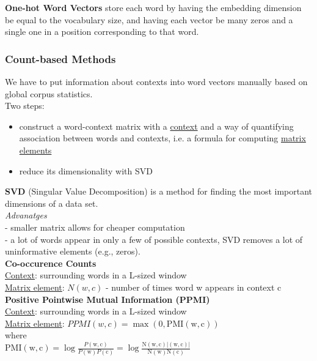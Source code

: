 \documentclass[8pt]{extarticle} %
\begin{document}
\begin{multicols*}{3}
\textbf{One-hot Word Vectors} store each word by having the embedding dimension be equal to the vocabulary size, and having each vector be many zeros and a single one in a position corresponding to that word.

\subsubsection*{Count-based Methods}
We have to put information about contexts into word vectors manually based on global corpus statistics.\\

Two steps: 
\begin{itemize}
    \item construct a word-context matrix with a \underline{context} and a way of quantifying association between words and contexts, i.e. a formula for computing \underline{matrix elements}
    \item reduce its dimensionality with SVD
\end{itemize}

\textbf{SVD} (Singular Value Decomposition) is a method for finding the most important dimensions of a data set.\\
\textit{Advanatges}\\
- smaller matrix allows for cheaper computation\\
- a lot of words appear in only a few of possible contexts, SVD removes a lot of uninformative elements (e.g., zeros).\\

\textbf{Co-occurence Counts} \\
\underline{Context}: surrounding words in a L-sized window\\
\underline{Matrix element}: $N(w, c)$ - number of times word w appears in context c\\

\textbf{Positive Pointwise Mutual Information (PPMI)}\\
\underline{Context}: surrounding words in a L-sized window\\
\underline{Matrix element}: $PPMI(w, c)=\max (0, \mathrm{PMI}(\mathrm{w}, \mathrm{c}))$\\ where \\
$\mathrm{PMI}(\mathrm{w}, \mathrm{c})=\log \frac{P(\mathrm{w}, \mathrm{c})}{P(\mathrm{w}) P(\mathrm{c})}=\log \frac{\mathrm{N}(\mathrm{w}, \mathrm{c})|(\mathrm{w}, \mathrm{c})|}{\mathrm{N}(\mathrm{w}) \mathrm{N}(\mathrm{c})}$\\


\end{multicols*}
\end{document}
